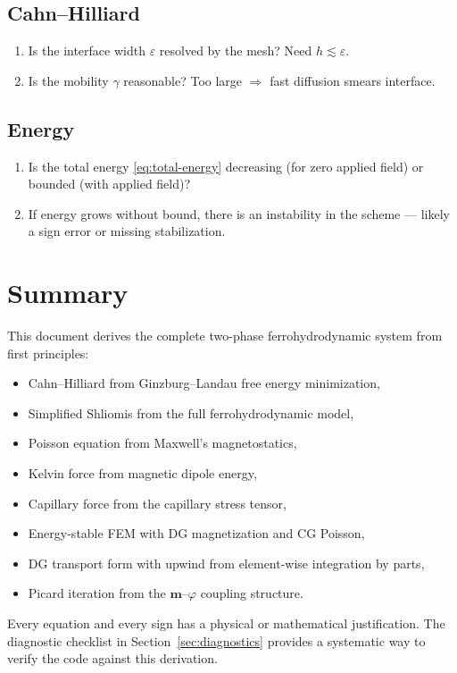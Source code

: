 \documentclass[11pt,a4paper]{article}
\theoremstyle{definition}
\theoremstyle{remark}
\newcommand{\eps}{\varepsilon}
\newcommand{\bfm}{\bm{m}}
\begin{document}
\subsection{Cahn--Hilliard}
\begin{enumerate}[label=(\alph*)]
  \item Is the interface width $\eps$ resolved by the mesh? Need
        $h \lesssim \eps$.
  \item Is the mobility $\gamma$ reasonable? Too large $\Rightarrow$
        fast diffusion smears interface.
\end{enumerate}

\subsection{Energy}
\begin{enumerate}[label=(\alph*)]
  \item Is the total energy \eqref{eq:total-energy} decreasing (for
        zero applied field) or bounded (with applied field)?
  \item If energy grows without bound, there is an instability in the
        scheme — likely a sign error or missing stabilization.
\end{enumerate}


\section*{Summary}

This document derives the complete two-phase ferrohydrodynamic system
from first principles:
\begin{itemize}[nosep]
  \item Cahn--Hilliard from Ginzburg--Landau free energy minimization,
  \item Simplified Shliomis from the full ferrohydrodynamic model,
  \item Poisson equation from Maxwell's magnetostatics,
  \item Kelvin force from magnetic dipole energy,
  \item Capillary force from the capillary stress tensor,
  \item Energy-stable FEM with DG magnetization and CG Poisson,
  \item DG transport form with upwind from element-wise integration by parts,
  \item Picard iteration from the $\bfm$--$\varphi$ coupling structure.
\end{itemize}

Every equation and every sign has a physical or mathematical justification.
The diagnostic checklist in Section~\ref{sec:diagnostics} provides a
systematic way to verify the code against this derivation.
\end{document}
